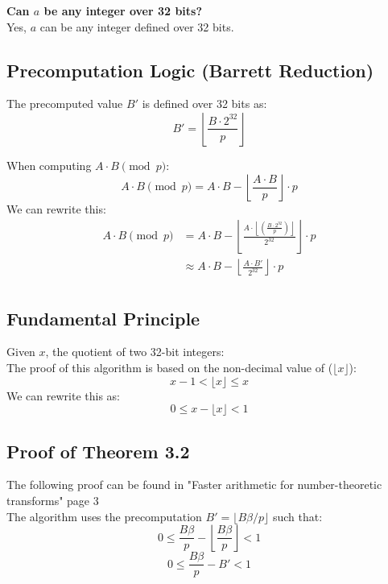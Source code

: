 \documentclass{article}
\begin{document}
\textbf{Can $a$ be any integer over 32 bits?} \\
Yes, $a$ can be any integer defined over 32 bits.

\newpage
\subsection{Precomputation Logic (Barrett Reduction)}
The precomputed value $B'$ is defined over 32 bits as:
\[B'= \left\lfloor \frac{B \cdot 2^{32}}{p}  \right\rfloor \]

When computing $A\cdot B\pmod{p}$:
\begin{equation*}
    A \cdot B \pmod{p} = A \cdot B -  \left\lfloor \frac{A \cdot B}{p} \right\rfloor \cdot p
\end{equation*}
We can rewrite this:
\begin{align*}
    A \cdot B \pmod{p} & = A \cdot B -  \left\lfloor \frac{A \cdot \left\lfloor (\frac{B \cdot 2^{32}}{p}) \right\rfloor}{2^{32}} \right\rfloor \cdot p \\
                       & \approx A \cdot B -  \left\lfloor \frac{A \cdot B'}{2^{32}} \right\rfloor \cdot p                                              \\
\end{align*}


\subsection{Fundamental Principle}
Given $x$, the quotient of two 32-bit integers: \\
The proof of this algorithm is based on the non-decimal value of ($\lfloor x \rfloor$):
$$x - 1 < \lfloor x \rfloor \le x$$
We can rewrite this as:
$$0 \le x - \lfloor x \rfloor < 1$$


\subsection{Proof of Theorem 3.2}
The following proof can be found in "Faster arithmetic for number-theoretic transforms" page 3 \cite{DBLP:journals/corr/abs-1205-2926} \\

The algorithm uses the precomputation $B' = \lfloor B\beta/p \rfloor$ such that:
\[0 \le \frac{B\beta}{p} - \left\lfloor \frac{B\beta}{p} \right\rfloor < 1 \]
\begin{equation}
    0 \le \frac{B\beta}{p} - B' < 1
\end{equation}
\end{document}
